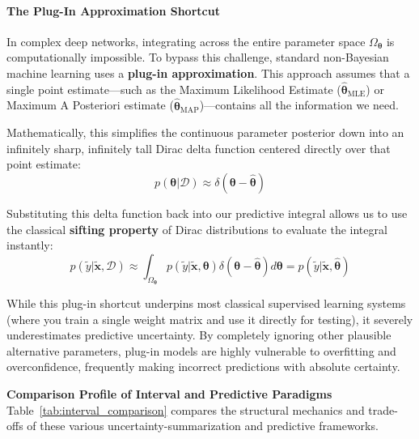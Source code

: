 \documentclass{article}
\begin{document}
\paragraph{The Plug-In Approximation Shortcut}
In complex deep networks, integrating across the entire parameter space $\Omega_{\boldsymbol{\theta}}$ is computationally impossible. To bypass this challenge, standard non-Bayesian machine learning uses a \textbf{plug-in approximation}. This approach assumes that a single point estimate—such as the Maximum Likelihood Estimate ($\hat{\boldsymbol{\theta}}_{\text{MLE}}$) or Maximum A Posteriori estimate ($\hat{\boldsymbol{\theta}}_{\text{MAP}}$)—contains all the information we need.

Mathematically, this simplifies the continuous parameter posterior down into an infinitely sharp, infinitely tall Dirac delta function centered directly over that point estimate:
\begin{equation}
p(\boldsymbol{\theta}|\mathcal{D}) \approx \delta(\boldsymbol{\theta} - \hat{\boldsymbol{\theta}})
\end{equation}

Substituting this delta function back into our predictive integral allows us to use the classical \textbf{sifting property} of Dirac distributions to evaluate the integral instantly:
\begin{equation}
p(\tilde{y}|\tilde{\mathbf{x}}, \mathcal{D}) \approx \int_{\Omega_{\boldsymbol{\theta}}} p(\tilde{y}|\tilde{\mathbf{x}}, \boldsymbol{\theta}) \delta(\boldsymbol{\theta} - \hat{\boldsymbol{\theta}}) d\boldsymbol{\theta} = p(\tilde{y}|\tilde{\mathbf{x}}, \hat{\boldsymbol{\theta}})
\end{equation}

While this plug-in shortcut underpins most classical supervised learning systems (where you train a single weight matrix and use it directly for testing), it severely underestimates predictive uncertainty. By completely ignoring other plausible alternative parameters, plug-in models are highly vulnerable to overfitting and overconfidence, frequently making incorrect predictions with absolute certainty.

\textbf{Comparison Profile of Interval and Predictive Paradigms}
Table~\ref{tab:interval_comparison} compares the structural mechanics and trade-offs of these various uncertainty-summarization and predictive frameworks.
\end{document}
